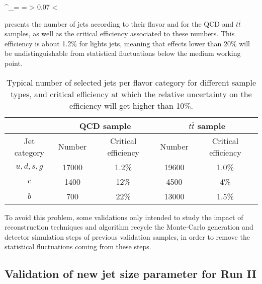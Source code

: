     {
        \sigma^_\epsilon = \frac{\sigma_\epsilon}{\epsilon} =  > 0.07
        \hspace*{1cm}
        \Rightarrow
        \hspace*{1cm}
        \epsilon < 
    }

     presents the number of jets according to their flavor
    and for the QCD and $t\bar{t}$ samples, as well as the critical efficiency associated
    to these numbers. This efficiency is about 1.2\% for lights jets, meaning that effects
    lower than 20\% will be undistinguishable from statistical fluctuations below the medium
    working point.

    \begin{table}
    \centering
    \begin{tabular}{c|cc|cc}
        \hline
                         & \multicolumn{2}{c}{QCD sample} & \multicolumn{2}{c}{$t\bar{t}$ sample} \\
        \hline
           Jet category  & Number & Critical efficiency   & Number & Critical efficiency \\
        \hline
            $u,d,s,g$    & 17000  & 1.2\%                 & 19600  & 1.0\% \\
            $c$          & 1400   & 12\%                  & 4500   & 4\%   \\
            $b$          & 700    & 22\%                  & 13000  & 1.5\% \\
        \hline
    \end{tabular}
        \caption{Typical number of selected jets per flavor category for different sample types,
        and critical efficiency at which the relative uncertainty on the efficiency will
        get higher than 10\%. \label{tab:criticalEfficiencyBTag}}
    \end{table}

    To avoid this problem, some validations only intended to study the impact of reconstruction
    techniques and algorithm recycle the Monte-Carlo generation and detector simulation
    steps of previous validation samples, in order to remove the statistical fluctuations
    coming from these steps.

        \subsection{Validation of new jet size parameter for Run II}

